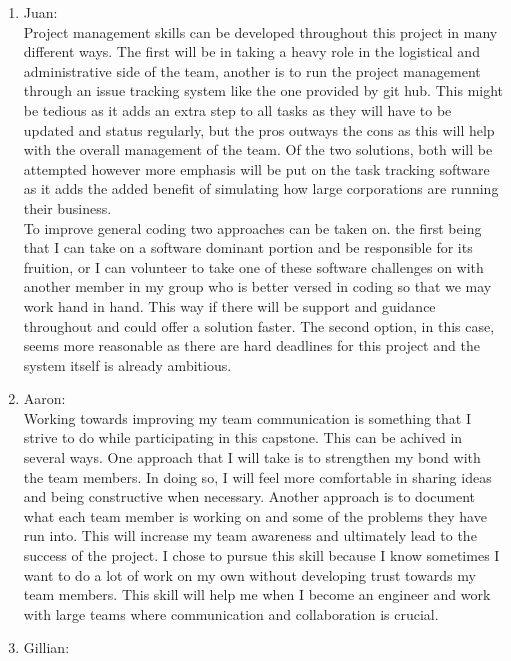 \documentclass[12pt]{article}
\begin{document}
\begin{enumerate}
\begin{enumerate}
    \item{Juan:}\\
        Project management skills can be developed throughout this project in many different ways.
        The first will be in taking a heavy role in the logistical and administrative side of the 
        team, another is to run the project management through an issue tracking system
        like the one provided by git hub. This might be tedious as it adds an extra step to all tasks as they will have to be
        updated and status regularly, but the pros outways the cons as this will help with the overall
        management of the team. Of the two solutions, both will be attempted however more emphasis will 
        be put on the task tracking software as it adds the added benefit of simulating how large
        corporations are running their business.\\
        To improve general coding two approaches can be taken on. the first being 
        that I can take on a software dominant portion and be responsible for its fruition, or I can volunteer
        to take one of these software challenges on with another member in my group who is better versed in
        coding so that we may work hand in hand. This way if there will be support and guidance throughout 
        and could offer a solution faster. The second option, in this case, seems more reasonable as there are
        hard deadlines for this project and the system itself is already ambitious.\\
    \item{Aaron:}\\
    Working towards improving my team communication is something that I strive to do while participating
    in this capstone. This can be achived in several ways. One approach that I will take is 
    to strengthen my bond with the team members. In doing so, I will feel more comfortable in sharing ideas and 
    being constructive when necessary. Another approach is to document what each team member is working on and some of the problems they have run into.
    This will increase my team awareness and ultimately lead to the success of the project. I chose to pursue this skill
    because I know sometimes I want to do a lot of work on my own without developing trust towards my team members. This skill
    will help me when I become an engineer and work with large teams where communication and collaboration is crucial.\\
    \item {Gillian:}\\

\end{enumerate}
\end{enumerate}
\end{document}
